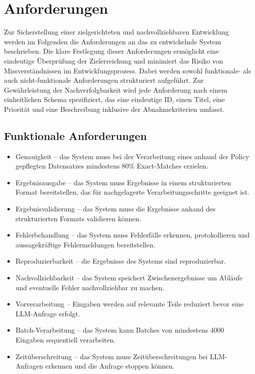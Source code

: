 \chapter{Anforderungen}\label{ch:anforderungen}

Zur Sicherstellung einer zielgerichteten und nachvollziehbaren Entwicklung werden im Folgenden die Anforderungen an das zu entwickelnde System beschrieben.
Die klare Festlegung dieser Anforderungen ermöglicht eine eindeutige Überprüfung der Zielerreichung und minimiert das Risiko von Missverständnissen im Entwicklungsprozess.
Dabei werden sowohl funktionale- als auch nicht-funktionale Anforderungen strukturiert aufgeführt.
Zur Gewährleistung der Nachverfolgbarkeit wird jede Anforderung nach einem einheitlichen Schema spezifiziert, das eine eindeutige ID, einen Titel, eine Priorität und eine Beschreibung inklusive der Abnahmekriterien umfasst.

\section{Funktionale Anforderungen}\label{sec:funktionale-anforderungen}

\begin{itemize}
    \item Genauigkeit -- das System muss bei der Verarbeitung eines anhand der Policy gepflegten Datensatzes mindestens 80\% Exact-Matches erzielen.
    \item Ergebnisausgabe -- das System muss Ergebnisse in einem strukturierten Format bereitstellen, das für nachgelagerte Verarbeitungsschritte geeignet ist.
    \item Ergebnisvalidierung -- das System muss die Ergebnisse anhand des strukturierten Formats validieren können.
    \item Fehlerbehandlung -- das System muss Fehlerfälle erkennen, protokollieren und aussagekräftige Fehlermeldungen bereitstellen.
    \item Reproduzierbarkeit -- die Ergebnisse des Systems sind reproduzierbar.
    \item Nachvollziehbarkeit -- das System speichert Zwischenergebnisse um Abläufe und eventuelle Fehler nachvollziehbar zu machen.
    \item Vorverarbeitung -- Eingaben werden auf relevante Teile reduziert bevor eine LLM-Anfrage erfolgt.
    \item Batch-Verarbeitung -- das System kann Batches von mindestens 4000 Eingaben sequentiell verarbeiten.
    \item Zeitüberschreitung -- das System muss Zeitüberschreitungen bei LLM-Anfragen erkennen und die Anfrage stoppen können.
\end{itemize}

